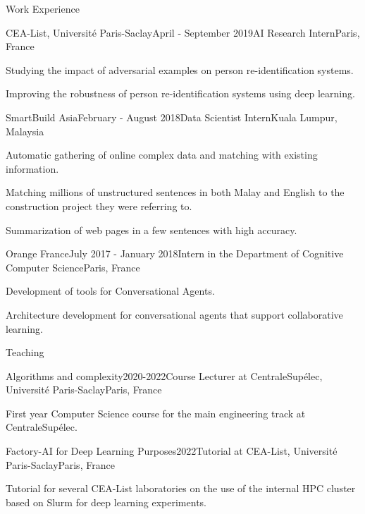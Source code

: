 \documentclass{resume} %
\begin{document}
\begin{rSection}{Work Experience}

\begin{rSubsection}{CEA-List, Université Paris-Saclay}{April - September 2019}{AI Research Intern}{Paris, France}

\item[] Studying the impact of adversarial examples on person re-identification systems.
\item[] Improving the robustness of person re-identification systems using deep learning.
\end{rSubsection}


\begin{rSubsection}{SmartBuild Asia}{February - August 2018}{Data Scientist Intern}{Kuala Lumpur, Malaysia}
\item[] Automatic gathering of online complex data and matching with existing information.
\item[] Matching millions of unstructured sentences in both Malay and English to the construction project they were referring to.
\item[] Summarization of web pages in a few sentences with high accuracy.

\end{rSubsection}


\begin{rSubsection}{Orange France}{July 2017 - January 2018}{Intern in the Department of Cognitive Computer Science}{Paris, France}
\item[] Development of tools for Conversational Agents.
\item[] Architecture development for conversational agents that support collaborative learning.
\end{rSubsection}

\end{rSection}

\pagebreak

\begin{rSection}{Teaching}

\begin{rSubsection}{Algorithms and complexity}{2020-2022}{Course Lecturer at CentraleSupélec, Université Paris-Saclay}{Paris, France}
    \item[] First year Computer Science course for the main engineering track at CentraleSupélec.
\end{rSubsection}

\begin{rSubsection}{Factory-AI for Deep Learning Purposes}{2022}{Tutorial at CEA-List, Université Paris-Saclay}{Paris, France}
    \item[] Tutorial for several CEA-List laboratories on the use of the internal HPC cluster based on Slurm for deep learning experiments.
\end{rSubsection}

\end{rSection}
\end{document}
